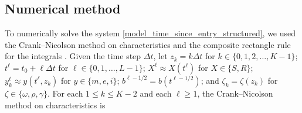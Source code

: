 \documentclass{jpmarticle}
\begin{document}
\subsection{Numerical method}

To numerically solve the system
\eqref{model_time_since_entry_structured}, we used the Crank--Nicolson
method on characteristics and the composite rectangle rule for the
integrals \autocite{milner_1992}.  Given the time step $\Delta t$,
let $z_k = k \Delta t$
for $k \in \{0, 1, 2, \ldots, K - 1\}$;
$t^{\ell} = t_0 + \ell \Delta t$
for $\ell \in \{0, 1, \ldots, L - 1\}$;
$X^{\ell} \approx X(t^{\ell})$
for $X \in \{S, R\}$;
$y_k^{\ell} \approx y(t^{\ell}, z_k)$
for $y \in \{m, e, i\}$;
$b^{\ell - 1 / 2} = b(t^{\ell - 1 / 2})$;
and $\zeta_k = \zeta(z_k)$
for $\zeta \in \{\omega, \rho, \gamma\}$.
For each $1 \leq k \leq K - 2$
and each $\ell \geq 1$,
the Crank--Nicolson method on characteristics is
\end{document}
